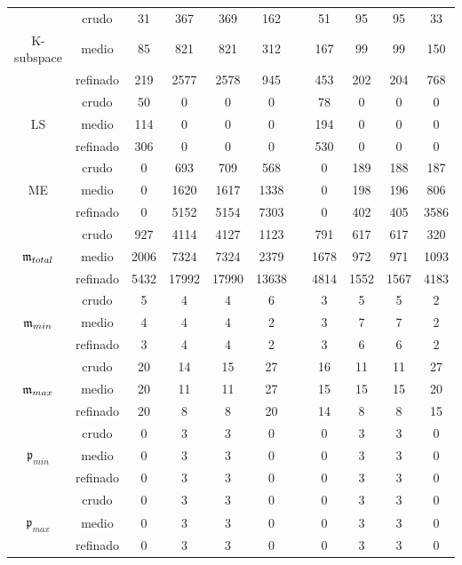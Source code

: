 \begin{table}
\begin{adjustbox}{width=0.95\columnwidth,center}
\begin{tabular}{ccccccccccc}
			\hline
			& crudo & 31 & 367 & 369 & 162 &  & 51 & 95 & 95 & 33 \\
			K-subspace & medio & 85 & 821 & 821 & 312 &  & 167 & 99 & 99 & 150 \\
			& refinado & 219 & 2577 & 2578 & 945 &  & 453 & 202 & 204 & 768 \\
			\hline
			& crudo & 50 & 0 & 0 & 0 &  & 78 & 0 & 0 & 0 \\
			LS & medio & 114 & 0 & 0 & 0 &  & 194 & 0 & 0 & 0 \\
			& refinado & 306 & 0 & 0 & 0 &  & 530 & 0 & 0 & 0 \\
			\hline
			& crudo & 0 & 693 & 709 & 568 &  & 0 & 189 & 188 & 187 \\
			ME & medio & 0 & 1620 & 1617 & 1338 &  & 0 & 198 & 196 & 806 \\
			& refinado & 0 & 5152 & 5154 & 7303 &  & 0 & 402 & 405 & 3586 \\
			\hline
			& crudo & 927 & 4114 & 4127 & 1123 &  & 791 & 617 & 617 & 320 \\
			$\mathfrak{m}_{total}$ & medio & 2006 & 7324 & 7324 & 2379 &  & 1678 & 972 & 971 & 1093 \\
			& refinado & 5432 & 17992 & 17990 & 13638 &  & 4814 & 1552 & 1567 & 4183 \\
			\hline
			& crudo & 5 & 4 & 4 & 6 &  & 3 & 5 & 5 & 2 \\
			$\mathfrak{m}_{min}$ & medio & 4 & 4 & 4 & 2 &  & 3 & 7 & 7 & 2 \\
			& refinado & 3 & 4 & 4 & 2 &  & 3 & 6 & 6 & 2 \\
			\hline
			& crudo & 20 & 14 & 15 & 27 &  & 16 & 11 & 11 & 27 \\
			$\mathfrak{m}_{max}$ & medio & 20 & 11 & 11 & 27 &  & 15 & 15 & 15 & 20 \\
			& refinado & 20 & 8 & 8 & 20 &  & 14 & 8 & 8 & 15 \\
			\hline
			& crudo & 0 & 3 & 3 & 0 &  & 0 & 3 & 3 & 0 \\
			$\mathfrak{p}_{min}$ & medio & 0 & 3 & 3 & 0 &  & 0 & 3 & 3 & 0 \\
			& refinado & 0 & 3 & 3 & 0 &  & 0 & 3 & 3 & 0 \\
			\hline
			& crudo & 0 & 3 & 3 & 0 &  & 0 & 3 & 3 & 0 \\
			$\mathfrak{p}_{max}$ & medio & 0 & 3 & 3 & 0 &  & 0 & 3 & 3 & 0 \\
			& refinado & 0 & 3 & 3 & 0 &  & 0 & 3 & 3 & 0 \\
			\hline
		\end{tabular}
	\end{adjustbox}
\end{table}

